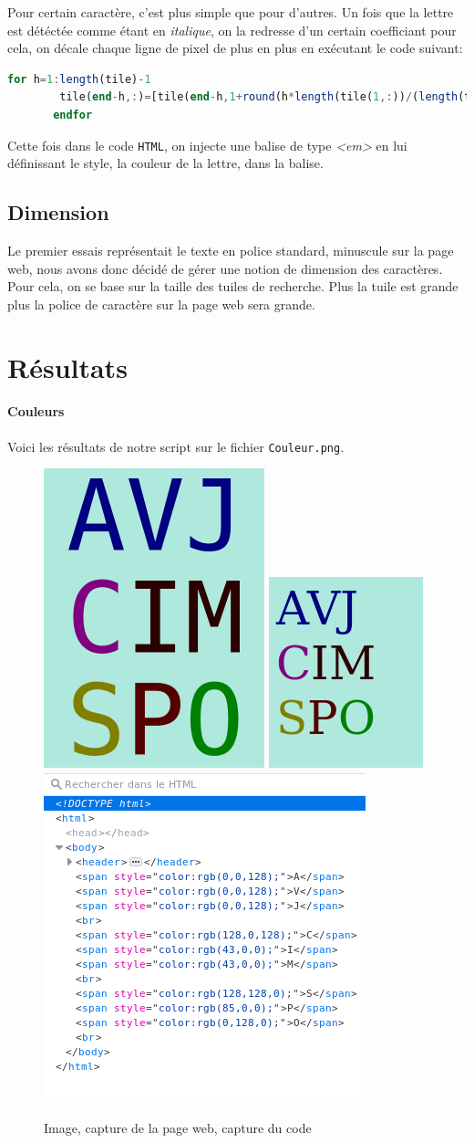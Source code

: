 \documentclass[a4paper,12pt,titlepage]{report}
\begin{document}
	Pour certain caractère, c'est plus simple que pour d'autres.
	Un fois que la lettre est détéctée comme étant en \textit{italique}, on la redresse d'un certain coefficiant pour cela, on décale chaque ligne de pixel de plus en plus en exécutant le code suivant:
	\begin{lstlisting}[caption={Redressage de caractère dans Octave},language=Octave]
 for h=1:length(tile)-1
        tile(end-h,:)=[tile(end-h,1+round(h*length(tile(1,:))/(length(tile)*4.1)):end) tile(end-h,1:round(h*length(tile(1,:))/(length(tile)*4.1)))];
       endfor
\end{lstlisting}
		Cette fois dans le code \texttt{HTML}, on injecte une balise de type \textsl{<em>} en lui définissant le style, la couleur de la lettre, dans la balise.
	\subsection{Dimension}
	Le premier essais représentait le texte en police standard, minuscule sur la page web, nous avons donc décidé de gérer une notion de dimension des caractères. Pour cela, on se base sur la taille des tuiles de recherche. Plus la tuile est grande plus la police de caractère sur la page web sera grande.
	\section{Résultats}
	\paragraph{Couleurs}
	Voici les résultats de notre script sur le fichier \texttt{Couleur.png}.
	\begin{figure}[h]
	\centering
		\includegraphics[height=0.25\textwidth]{../illus/Couleur.png}
		\includegraphics[height=0.25\textwidth]{../illus/CouleurR.png}
		\includegraphics[height=0.25\textwidth]{../illus/CouleurC.png}
		\caption{Image, capture de la page web, capture du code}
	\end{figure}
\end{document}
